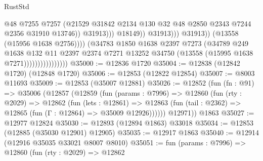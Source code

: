 \begin{lexlean}{RustStd}
\begin{coremodule}
                                                      @48
                                                      @7255
                                                      @7257
                                                      (@21529
                                                        @31842
                                                        @2134
                                                        @130
                                                        @32
                                                        @48
                                                        @2850
                                                        @2343
                                                        @7244
                                                        @2356
                                                        @31910
                                                        @13746))
                                                    @31913)))
                                              @18149))
                                          @31913)))
                                    @31913))
                                (@13558 (@15956 @1638 @2756))))
                            (@34783
                              @1850
                              @1638
                              @2397
                              @7273
                              (@34789
                                @249
                                @1638
                                @132
                                @11
                                @2397
                                @2374
                                @7271
                                @13252
                                @34750
                                (@13558 (@15995 @1638 @7271))))))))))))))))
@35000 := @12836 @1720
@35004 := @12838 (@12842 @1720) (@12848 @1720)
@35006 := @12853 (@12822 @12854)
@35007 := @8003 @11693
@35009 := @12853 (@35007 @12881)
@35026 := @12852
    (fun (fn : @91) =>
    @35006
      (@12857
        (@12859
          (fun (params : @7996) =>
          @12860
            (fun (rty : @2029) =>
            @12862
              (fun (lets : @12861) =>
              @12863 (fun (tail : @2362) => @12865 (fun (Γ : @12864) => @35009 @12926))))))
        @12971))
    @1863
@35027 := @12977 @12824
@35030 := @12893 (@12894 @1863) @33018
@35034 := @12853 (@12885 (@35030 @12901) @12905)
@35035 := @12917 @1863
@35040 := @12914 (@12916 @35035 @33021 @8007 @8010)
@35051 := fun (params : @7996) =>
  @12860
    (fun (rty : @2029) =>
    @12862

\end{coremodule}
\end{lexlean}

